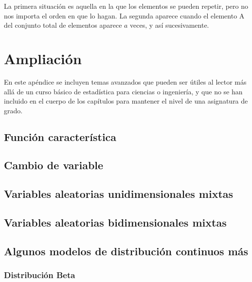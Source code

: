 \documentclass[
]{article}
\begin{document}
La primera situación es aquella en la que los elementos se pueden
repetir, pero no nos importa el orden en que lo hagan. La segunda
aparece cuando el elemento A del conjunto total de elementos aparece
\(a\) veces, y así sucesivamente.

\hypertarget{ampliaciuxf3n}{%
\section{Ampliación}\label{ampliaciuxf3n}}

En este apéndice se incluyen temas avanzados que pueden ser útiles al
lector más allá de un curso básico de estadística para ciencias o
ingeniería, y que no se han incluido en el cuerpo de los capítulos para
mantener el nivel de una asignatura de grado.

\hypertarget{funciuxf3n-caracteruxedstica}{%
\subsection{Función característica}\label{funciuxf3n-caracteruxedstica}}

\hypertarget{cambio-de-variable}{%
\subsection{Cambio de variable}\label{cambio-de-variable}}

\hypertarget{variables-aleatorias-unidimensionales-mixtas}{%
\subsection{Variables aleatorias unidimensionales
mixtas}\label{variables-aleatorias-unidimensionales-mixtas}}

\hypertarget{variables-aleatorias-bidimensionales-mixtas}{%
\subsection{Variables aleatorias bidimensionales
mixtas}\label{variables-aleatorias-bidimensionales-mixtas}}

\hypertarget{algunos-modelos-de-distribuciuxf3n-continuos-muxe1s}{%
\subsection{Algunos modelos de distribución continuos
más}\label{algunos-modelos-de-distribuciuxf3n-continuos-muxe1s}}

\hypertarget{distribuciuxf3n-beta}{%
\subsubsection{Distribución Beta}\label{distribuciuxf3n-beta}}
\end{document}
